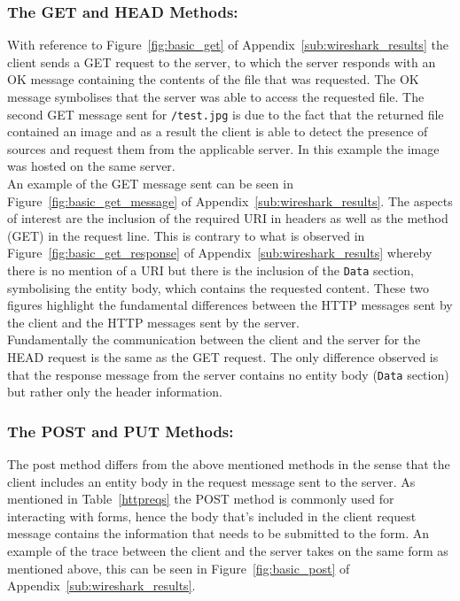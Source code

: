 \documentclass[10pt,twocolumn]{witseiepaper}
\begin{document}
		\subsubsection*{The GET and HEAD Methods:} With reference to Figure~\ref{fig:basic_get} of Appendix~\ref{sub:wireshark_results} the client sends a GET request to the server, to which the server responds with an OK message containing the contents of the file that was requested. The OK message symbolises that the server was able to access the requested file. The second GET message sent for \texttt{/test.jpg} is due to the fact that the returned file contained an image and as a result the client is able to detect the presence of sources and request them from the applicable server. In this example the image was hosted on the same server. \\
		
		An example of the GET message sent can be seen in Figure~\ref{fig:basic_get_message} of Appendix~\ref{sub:wireshark_results}. The aspects of interest are the inclusion of the required URI in headers as well as the method (GET) in the request line. This is contrary to what is observed in Figure~\ref{fig:basic_get_response} of Appendix~\ref{sub:wireshark_results} whereby there is no mention of a URI but there is the inclusion of the \texttt{Data} section, symbolising the entity body, which contains the requested content. These two figures highlight the fundamental differences between the HTTP messages sent by the client and the HTTP messages sent by the server. \\
		
		Fundamentally the communication between the client and the server for the HEAD request is the same as the GET request. The only difference observed is that the response message from the server contains no entity body (\texttt{Data} section) but rather only the header information. 
		
		
		\subsubsection*{The POST and PUT Methods:} The post method differs from the above mentioned methods in the sense that the client includes an entity body in the request message sent to the server. As mentioned in Table~\ref{httpreqs} the POST method is commonly used for interacting with forms, hence the body that's included in the client request message contains the information that needs to be submitted to the form. An example of the trace between the client and the server takes on the same form as mentioned above, this can be seen in Figure~\ref{fig:basic_post} of Appendix~\ref{sub:wireshark_results}.
		
\end{document}
